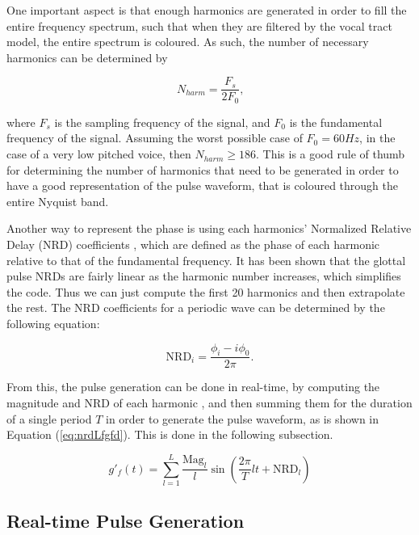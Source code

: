 One important aspect is that enough harmonics are generated in order to fill the entire frequency spectrum, such that when they are filtered by the vocal tract model, the entire spectrum is coloured. As such, the number of necessary harmonics can be determined by

\begin{equation}
    N_{harm} = \frac{F_s}{2F_0} \text{,}
    \label{eq:harmonics}
\end{equation}

\noindent where $F_s$ is the sampling frequency of the signal, and $F_0$ is the fundamental frequency of the signal. Assuming the worst possible case of $F_0 = 60Hz$, in the case of a very low pitched voice, then $N_{harm} \ge 186$. This is a good rule of thumb for determining the number of harmonics that need to be generated in order to have a good representation of the pulse waveform, that is coloured through the entire Nyquist band.

Another way to represent the phase is using each harmonics' Normalized Relative Delay (NRD) coefficients \cite{ferreira2018holistic}, which are defined as the phase of each harmonic relative to that of the fundamental frequency. It has been shown that the glottal pulse NRDs are fairly linear as the harmonic number increases, which simplifies the code. Thus we can just compute the first 20 harmonics and then extrapolate the rest. The NRD coefficients for a periodic wave can be determined by the following equation:

\begin{equation}
    \text{NRD}_i = \frac{\phi_i- i\phi_0}{2\pi} \text{.}
    \label{eq:nrd}
\end{equation}

From this, the pulse generation can be done in real-time, by computing the magnitude and NRD of each harmonic \cite{ferreiraImpactShiftInvariantHarmonic2020}, and then summing them for the duration of a single period $T$ in order to generate the pulse waveform, as is shown in Equation (\ref{eq:nrdLfgfd}). This is done in the following subsection.

\begin{equation}
    g'_f(t) = \sum_{l=1}^L \frac{\text{Mag}_l}{l} \sin \left (\frac{2\pi}{T}lt + \text{NRD}_l \right )
    \label{eq:nrdLfgfd}
\end{equation}

\subsection{Real-time Pulse Generation}

